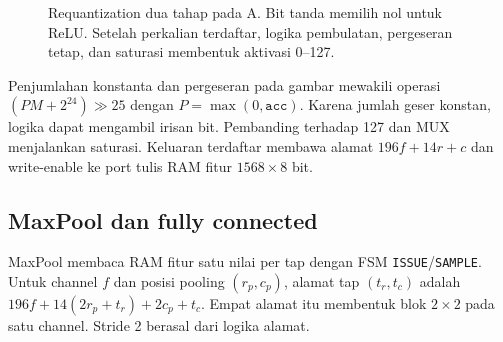 \begin{figure}[H]
\centering
{}
\caption{Requantization dua tahap pada A. Bit tanda memilih nol untuk ReLU. Setelah perkalian terdaftar, logika pembulatan, pergeseran tetap, dan saturasi membentuk aktivasi 0--127.}
\label{fig:hw-requant}
\end{figure}

Penjumlahan konstanta dan pergeseran pada gambar mewakili operasi
\((P M+2^{24})\mathbin{\gg}25\) dengan \(P=\max(0,\texttt{acc})\).
Karena jumlah geser konstan, logika dapat mengambil irisan bit.
Pembanding terhadap 127 dan MUX menjalankan saturasi. Keluaran
terdaftar membawa alamat \(196f+14r+c\) dan write-enable ke port tulis
RAM fitur \(1568\times8\) bit.

\clearpage
\subsection{MaxPool dan fully connected}
MaxPool membaca RAM fitur satu nilai per tap dengan FSM
\texttt{ISSUE}/\texttt{SAMPLE}. Untuk channel \(f\) dan posisi pooling
\((r_p,c_p)\), alamat tap \((t_r,t_c)\) adalah
\(196f+14(2r_p+t_r)+2c_p+t_c\). Empat alamat itu membentuk blok
\(2\times2\) pada satu channel. Stride 2 berasal dari logika alamat.

